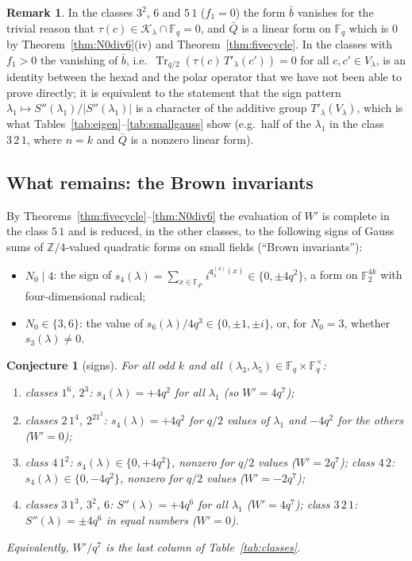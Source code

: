 \documentclass[12pt,a4paper]{amsart}
\newtheorem{conjecture}[theorem]{Conjecture}
\theoremstyle{definition}
\newtheorem{remark}[theorem]{Remark}
\newcommand{\F}{\mathbb{F}}
\newcommand{\Z}{\mathbb{Z}}
\newcommand{\Tr}{\operatorname{Tr}}
\newcommand{\Kk}{\mathcal{K}}
\newcommand{\qq}{\mathfrak{q}}
\newcommand{\Spp}{S''}
\begin{document}
\begin{remark}
In the classes $3^2$, $6$ and $5\,1$ ($f_1=0$) the form $\bar b$ vanishes for the trivial reason that $\tau(c)\in\Kk_\lambda\cap\F_q=0$, and $\bar Q$ is a linear form on $\F_q$ which is $0$ by Theorem~\ref{thm:N0div6}(iv) and Theorem~\ref{thm:fivecycle}. In the classes with $f_1>0$ the vanishing of $\bar b$, i.e.\ $\Tr_{q/2}(\tau(c)\,T'_\lambda(c'))=0$ for all $c,c'\in V_\lambda$, is an identity between the hexad and the polar operator that we have not been able to prove directly; it is equivalent to the statement that the sign pattern $\lambda_1\mapsto\Spp(\lambda_1)/|\Spp(\lambda_1)|$ is a character of the additive group $T'_\lambda(V_\lambda)$, which is what Tables~\ref{tab:eigen}--\ref{tab:smallgauss} show (e.g.\ half of the $\lambda_1$ in the class $3\,2\,1$, where $n=k$ and $\bar Q$ is a nonzero linear form).
\end{remark}

\subsection{What remains: the Brown invariants}\label{subsec:remains}
By Theorems~\ref{thm:fivecycle}--\ref{thm:N0div6} the evaluation of $W'$ is complete in the class $5\,1$ and is reduced, in the other classes, to the following signs of Gauss sums of $\Z/4$-valued quadratic forms on small fields (``Brown invariants''):
\begin{itemize}[leftmargin=2em]
\item $N_0\mid4$: the sign of $s_4(\lambda)=\sum_{x\in\F_{q^4}}i^{\qq^{(4)}_\lambda(x)}\in\{0,\pm4q^2\}$, a form on $\F_2^{4k}$ with four-dimensional radical;
\item $N_0\in\{3,6\}$: the value of $s_6(\lambda)/4q^3\in\{0,\pm1,\pm i\}$, or, for $N_0=3$, whether $s_3(\lambda)\ne0$.
\end{itemize}

\begin{conjecture}[signs]\label{conj:signs}
For all odd $k$ and all $(\lambda_3,\lambda_5)\in\F_q\times\F_q^\times$:
\begin{enumerate}[label=\textup{(\roman*)},leftmargin=2em]
\item classes $1^6$, $2^3$: $s_4(\lambda)=+4q^2$ for all $\lambda_1$ (so $W'=4q^7$);
\item classes $2\,1^4$, $2^21^2$: $s_4(\lambda)=+4q^2$ for $q/2$ values of $\lambda_1$ and $-4q^2$ for the others ($W'=0$);
\item class $4\,1^2$: $s_4(\lambda)\in\{0,+4q^2\}$, nonzero for $q/2$ values ($W'=2q^7$); class $4\,2$: $s_4(\lambda)\in\{0,-4q^2\}$, nonzero for $q/2$ values ($W'=-2q^7$);
\item classes $3\,1^3$, $3^2$, $6$: $\Spp(\lambda)=+4q^6$ for all $\lambda_1$ ($W'=4q^7$); class $3\,2\,1$: $\Spp(\lambda)=\pm4q^6$ in equal numbers ($W'=0$).
\end{enumerate}
Equivalently, $W'/q^7$ is the last column of Table~\ref{tab:classes}.
\end{conjecture}
\end{document}
